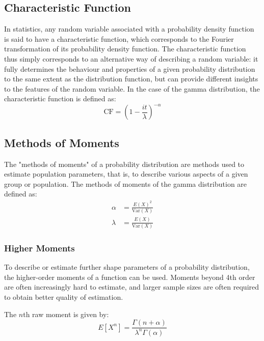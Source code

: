 \documentclass[12pt]{article}
\begin{document}
\subsection{Characteristic Function}\label{subec:advancedproperties:cf}
In statistics, any random variable associated with a probability density function is said to have a characteristic
function, which corresponds to the Fourier transformation of its probability density function. The characteristic
function thus simply corresponds to an alternative way of describing a random variable: it fully determines the behaviour
and properties of a given probability distribution to the same extent as the distribution function, but can provide
different insights to the features of the random variable. In the case of the gamma distribution, the characteristic
function is defined as\cite{wikipediaCharacteristicFunctionProbability2022}:
\begin{equation}
	\text{CF} = \left(1-\frac{it}{\lambda}\right)^{-\alpha}
\end{equation}

\subsection{Methods of Moments}
The "methods of moments" of a probability distribution are methods used to estimate population parameters, that is, to
describe various aspects of a given group or population. The methods of moments of the gamma distribution are defined
as\cite{wikipediaMethodMomentsStatistics2021, limWhatPopulationParameter2019}:
\begin{equation}
	\begin{split}
		\alpha	&=	\frac{E(X)^2}{\text{Var}(X)}\\
		\lambda	&=	\frac{E(X)}{\text{Var}(X)}
	\end{split}
\end{equation}

\subsubsection{Higher Moments}
To describe or estimate further shape parameters of a probability distribution, the higher-order moments of a function
can be used. Moments beyond 4th order are often increasingly hard to estimate, and larger sample sizes are often
required to obtain better quality of estimation\cite{wikipediaMomentMathematics2022}.

The $n$th raw moment is given by:
\begin{equation}
	E[X^n] = \frac{\Gamma(n+\alpha)}{\lambda^n\Gamma(\alpha)}
\end{equation}
\end{document}

